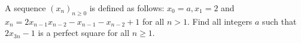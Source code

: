 A sequence $(x_n)_{n\ge 0}$ is defined as follows: $x_0=a,x_1=2$ and $x_n=2x_{n-1}x_{n-2}-x_{n-1}-x_{n-2}+1$ for all $n>1$. Find all integers $a$ such that $2x_{3n}-1$ is a perfect square for all $n\ge 1$.